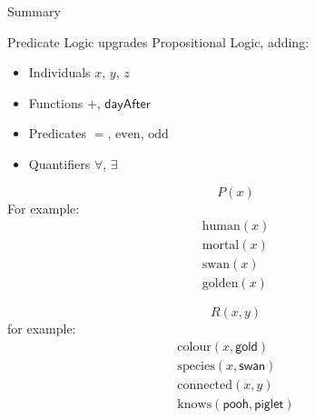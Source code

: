 \documentclass[xetex,aspectratio=169,14pt,hyperref={pdfpagelabels=true,pdflang={en-GB}}]{beamer}
\begin{document}
\begin{frame}
  {Summary}

  Predicate Logic upgrades Propositional Logic, adding:
  \begin{itemize}
  \item Individuals $x$, $y$, $z$
  \item Functions $+$, $\mathsf{dayAfter}$
  \item Predicates $=$, $\mathrm{even}$, $\mathrm{odd}$
  \item Quantifiers $\forall$, $\exists$
  \end{itemize}
\end{frame}


\begin{frame}[t]
  \begin{displaymath}
    P(x)
  \end{displaymath}
  For example:
  \begin{displaymath}
    \begin{array}{c}
      \mathrm{human}(x) \\
      \mathrm{mortal}(x) \\
      \mathrm{swan}(x) \\
      \mathrm{golden}(x)
    \end{array}
  \end{displaymath}
\end{frame}

\begin{frame}[t]
  \begin{displaymath}
    R(x,y)
  \end{displaymath}
  for example:
  \begin{displaymath}
    \begin{array}{c}
      \mathrm{colour}(x, \mathsf{gold}) \\
      \mathrm{species}(x, \mathsf{swan}) \\
      \mathrm{connected}(x,y) \\
      \mathrm{knows}(\mathsf{pooh},\mathsf{piglet})
    \end{array}
  \end{displaymath}
\end{frame}
\end{document}
